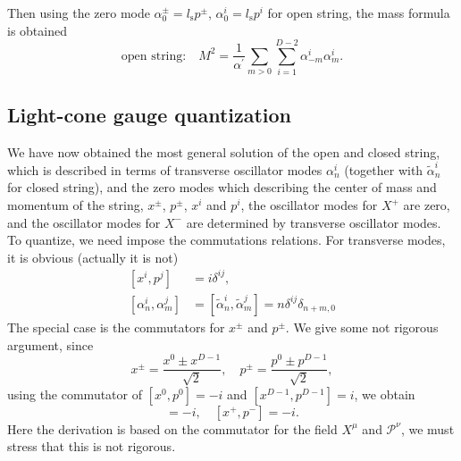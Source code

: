 \documentclass[graybox,envcountchap,sectrefs]{svmono}
\begin{document}
Then using the zero mode $\alpha_0^{\pm}=l_{\mathrm{s}}p^{\pm}$, $\alpha_0^i=l_{\mathrm{s}}p^{i}$ for open string, the mass formula is obtained
\begin{equation}
\boxed{
\text{open string:}\quad M^2=\frac{1}{\alpha^{\prime}}\sum_{m>0}\sum_{i=1}^{D-2} \alpha_{-m}^{i} \alpha_{m}^{i}.
}
\end{equation}



\subsection{Light-cone gauge quantization}
We have now obtained the most general solution of the open and closed string, which is described in terms of transverse oscillator modes $\alpha_n^{i}$ (together with $\tilde{\alpha}_n^{i}$ for closed string), and the zero modes  which describing the center of mass and momentum of the string, $x^{\pm}$, $p^{\pm}$, $x^i$ and $p^i$, the oscillator modes for $X^{+}$ are zero, and the oscillator modes for $X^{-}$ are determined by transverse oscillator modes.
To quantize, we need impose the commutations relations. For transverse modes, it is obvious (actually it is not)
\begin{equation}
\begin{aligned}
\left[x^{i}, p^{j}\right] &=i \delta^{i j}, \\
\left[\alpha_{n}^{i}, \alpha_{m}^{j}\right] &=\left[\tilde{\alpha}_{n}^{i}, \tilde{\alpha}_{m}^{j}\right]=n \delta^{i j} \delta_{n+m, 0}
\end{aligned}
\end{equation}
The special case is the commutators for $x^{\pm}$ and $p^{\pm}$. We give some not rigorous argument, since
\begin{equation}
x^{\pm}=\frac{x^0\pm x^{D-1}}{\sqrt{2}},\quad p^{\pm}=\frac{p^0\pm p^{D-1}}{\sqrt{2}},
\end{equation}
using the commutator of $[x^0,p^0]=-i$ and $[x^{D-1},p^{D-1}]=i$, we obtain 
\begin{equation}
[x^-, p^+]=-i, \quad [x^+,p^-]=-i.
\end{equation}
Here the derivation is based on the commutator for the field $X^{\mu}$ and $\mathcal{P}^{\nu}$, we must stress that this is not rigorous.
\end{document}
